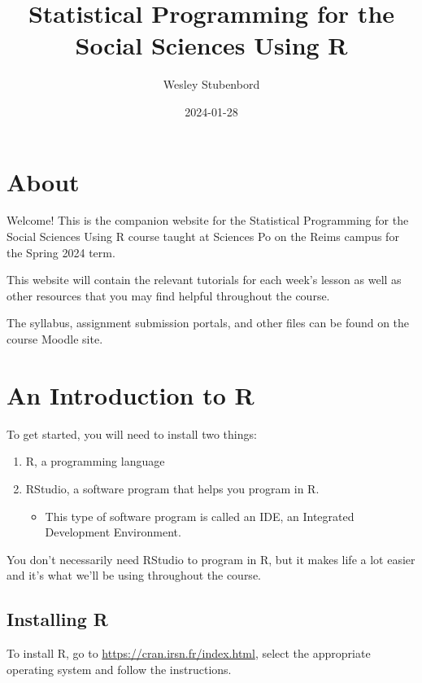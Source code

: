\documentclass[
]{book}
\title{Statistical Programming for the Social Sciences Using R}
\author{Wesley Stubenbord}
\date{2024-01-28}
\providecommand{\tightlist}{%
  \setlength{\itemsep}{0pt}\setlength{\parskip}{0pt}}
\begin{document}
\maketitle

{
\setcounter{tocdepth}{1}
\tableofcontents
}
\hypertarget{about}{%
\chapter{About}\label{about}}

Welcome! This is the companion website for the Statistical Programming for the Social Sciences Using R course taught at Sciences Po on the Reims campus for the Spring 2024 term.

This website will contain the relevant tutorials for each week's lesson as well as other resources that you may find helpful throughout the course.

The syllabus, assignment submission portals, and other files can be found on the course Moodle site.

\hypertarget{an-introduction-to-r}{%
\chapter{An Introduction to R}\label{an-introduction-to-r}}

To get started, you will need to install two things:

\begin{enumerate}
\def\labelenumi{\arabic{enumi}.}
\item
  R, a programming language
\item
  RStudio, a software program that helps you program in R.

  \begin{itemize}
  \tightlist
  \item
    This type of software program is called an IDE, an Integrated Development Environment.
  \end{itemize}
\end{enumerate}

You don't necessarily need RStudio to program in R, but it makes life a lot easier and it's what we'll be using throughout the course.

\hypertarget{installing-r}{%
\section{Installing R}\label{installing-r}}

To install R, go to \url{https://cran.irsn.fr/index.html}, select the appropriate operating system and follow the instructions.
\end{document}
